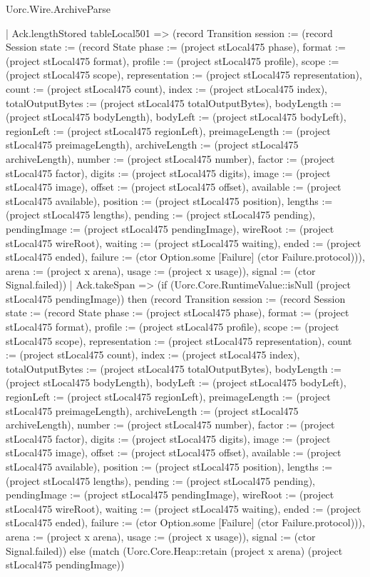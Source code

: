\begin{lexlean}{Uorc.Wire.ArchiveParse}
\begin{semanticmodule}
{          | Ack.lengthStored tableLocal501 => (record Transition {session := (record Session {state := (record State {phase := (project stLocal475 phase), format := (project stLocal475 format), profile := (project stLocal475 profile), scope := (project stLocal475 scope), representation := (project stLocal475 representation), count := (project stLocal475 count), index := (project stLocal475 index), totalOutputBytes := (project stLocal475 totalOutputBytes), bodyLength := (project stLocal475 bodyLength), bodyLeft := (project stLocal475 bodyLeft), regionLeft := (project stLocal475 regionLeft), preimageLength := (project stLocal475 preimageLength), archiveLength := (project stLocal475 archiveLength), number := (project stLocal475 number), factor := (project stLocal475 factor), digits := (project stLocal475 digits), image := (project stLocal475 image), offset := (project stLocal475 offset), available := (project stLocal475 available), position := (project stLocal475 position), lengths := (project stLocal475 lengths), pending := (project stLocal475 pending), pendingImage := (project stLocal475 pendingImage), wireRoot := (project stLocal475 wireRoot), waiting := (project stLocal475 waiting), ended := (project stLocal475 ended), failure := (ctor Option.some [Failure] (ctor Failure.protocol))}), arena := (project x arena), usage := (project x usage)}), signal := (ctor Signal.failed)})
          | Ack.takeSpan => (if (Uorc.Core.RuntimeValue::isNull (project stLocal475 pendingImage)) then (record Transition {session := (record Session {state := (record State {phase := (project stLocal475 phase), format := (project stLocal475 format), profile := (project stLocal475 profile), scope := (project stLocal475 scope), representation := (project stLocal475 representation), count := (project stLocal475 count), index := (project stLocal475 index), totalOutputBytes := (project stLocal475 totalOutputBytes), bodyLength := (project stLocal475 bodyLength), bodyLeft := (project stLocal475 bodyLeft), regionLeft := (project stLocal475 regionLeft), preimageLength := (project stLocal475 preimageLength), archiveLength := (project stLocal475 archiveLength), number := (project stLocal475 number), factor := (project stLocal475 factor), digits := (project stLocal475 digits), image := (project stLocal475 image), offset := (project stLocal475 offset), available := (project stLocal475 available), position := (project stLocal475 position), lengths := (project stLocal475 lengths), pending := (project stLocal475 pending), pendingImage := (project stLocal475 pendingImage), wireRoot := (project stLocal475 wireRoot), waiting := (project stLocal475 waiting), ended := (project stLocal475 ended), failure := (ctor Option.some [Failure] (ctor Failure.protocol))}), arena := (project x arena), usage := (project x usage)}), signal := (ctor Signal.failed)}) else (match (Uorc.Core.Heap::retain (project x arena) (project stLocal475 pendingImage))
}
\end{semanticmodule}
\end{lexlean}
